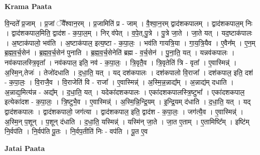 \documentclass[17pt]{extarticle}
\begin{document}
\textbf{Krama Paata} \newline

वि॒न्दते᳚ प्र॒जाम् । प्र॒जां ॅवै᳚श्वान॒रम् । प्र॒जामिति॑ प्र - जाम् । वै॒श्वा॒न॒रम् द्वाद॑शकपालम् । द्वाद॑शकपाल॒म् निः । द्वाद॑शकपाल॒मिति॒ द्वाद॑श - क॒पा॒ल॒म् । निर् व॑पेत् । व॒पे॒त्,पु॒त्रे । पु॒त्रे जा॒ते । जा॒ते यत् । यद॒ष्टाक॑पालः । अ॒ष्टाक॑पालो॒ भव॑ति । अ॒ष्टाक॑पाल॒ इत्य॒ष्टा - क॒पा॒लः॒ । भव॑ति गायत्रि॒या । गा॒य॒त्रि॒यैव । ए॒वैन᳚म् । ए॒न॒म् ब्र॒ह्म॒व॒र्च॒सेन॑ । ब्र॒ह्म॒व॒र्च॒सेन॑ पुनाति । ब्र॒ह्म॒व॒र्च॒सेनेति॑ ब्रह्म - व॒र्च॒सेन॑ । पु॒ना॒ति॒ यत् । यन्नव॑कपालः । नव॑कपालस्त्रि॒वृता᳚ । नव॑कपाल॒ इति॒ नव॑ - क॒पा॒लः॒ । त्रि॒वृतै॒व । त्रि॒वृतेति॑ त्रि - वृता᳚ । ए॒वास्मिन्न्॑ । अ॒स्मि॒न्,तेजः॑ । तेजो॑दधाति । द॒धा॒ति॒ यत् । यद् दश॑कपालः । दश॑कपालो वि॒राजा᳚ । दश॑कपाल॒ इति॒ दश॑ - क॒पा॒लः॒ । वि॒राजै॒व । वि॒राजेति॑ वि - राजा᳚ । ए॒वास्मिन्न्॑ । अ॒स्मि॒न्न॒न्नाद्य᳚म् । अ॒न्नाद्य॑म् दधाति । अ॒न्नाद्य॒मित्य॑न्न - अद्य᳚म् । द॒धा॒ति॒ यत् । यदेका॑दशकपालः । एका॑दशकपालस्त्रि॒ष्टुभा᳚ । एका॑दशकपाल॒ इत्येका॑दश - क॒पा॒लः॒ । त्रि॒ष्टुभै॒व । ए॒वास्मिन्न्॑ । अ॒स्मि॒न्नि॒न्द्रि॒यम् । इ॒न्द्रि॒यम् द॑धाति । द॒धा॒ति॒ यत् । यद् द्वाद॑शकपालः । द्वाद॑शकपालो॒ जग॑त्या । द्वाद॑शकपाल॒ इति॒ द्वाद॑श - क॒पा॒लः॒ । जग॑त्यै॒व । ए॒वास्मिन्न्॑ । अ॒स्मि॒न् प॒शून् । प॒शून् द॑धाति । द॒धा॒ति॒ यस्मिन्न्॑ । यस्मि॑न् जा॒ते । जा॒त ए॒ताम् । ए॒तामिष्टि᳚म् । इष्टि॑म् नि॒र्वप॑ति । नि॒र्वप॑ति पू॒तः । नि॒र्वप॒तीति॑ निः - वप॑ति । पू॒त ए॒व \newline

\textbf{Jatai Paata} \newline
\end{document}
